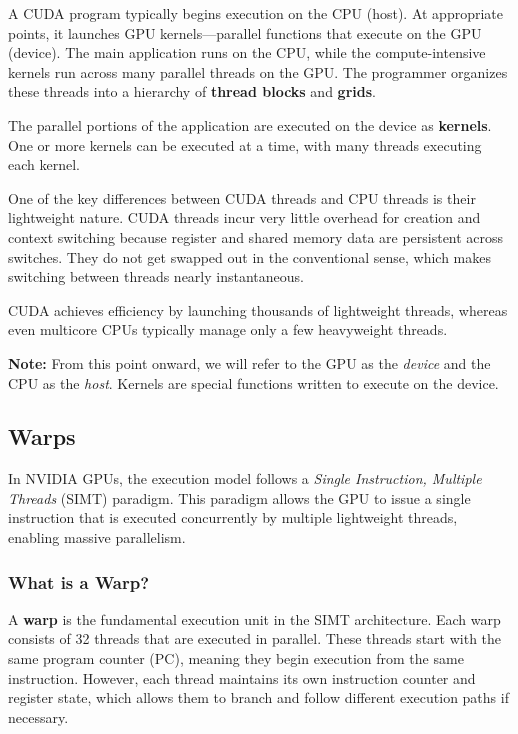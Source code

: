 \documentclass[12pt]{book}
\begin{document}
A CUDA program typically begins execution on the CPU (host). At appropriate points, it launches GPU kernels—parallel functions that execute on the GPU (device). The main application runs on the CPU, while the compute-intensive kernels run across many parallel threads on the GPU. The programmer organizes these threads into a hierarchy of \textbf{thread blocks} and \textbf{grids}.

The parallel portions of the application are executed on the device as \textbf{kernels}. One or more kernels can be executed at a time, with many threads executing each kernel.

One of the key differences between CUDA threads and CPU threads is their lightweight nature. CUDA threads incur very little overhead for creation and context switching because register and shared memory data are persistent across switches. They do not get swapped out in the conventional sense, which makes switching between threads nearly instantaneous.

CUDA achieves efficiency by launching thousands of lightweight threads, whereas even multicore CPUs typically manage only a few heavyweight threads.

\textbf{Note:} From this point onward, we will refer to the GPU as the \emph{device} and the CPU as the \emph{host}. Kernels are special functions written to execute on the device.

\subsection{Warps}

In NVIDIA GPUs, the execution model follows a \textit{Single Instruction, Multiple Threads} (SIMT) paradigm. This paradigm allows the GPU to issue a single instruction that is executed concurrently by multiple lightweight threads, enabling massive parallelism.

\subsubsection*{What is a Warp?}
A \textbf{warp} is the fundamental execution unit in the SIMT architecture. Each warp consists of 32 threads that are executed in parallel. These threads start with the same program counter (PC), meaning they begin execution from the same instruction. However, each thread maintains its own instruction counter and register state, which allows them to branch and follow different execution paths if necessary.
\end{document}
